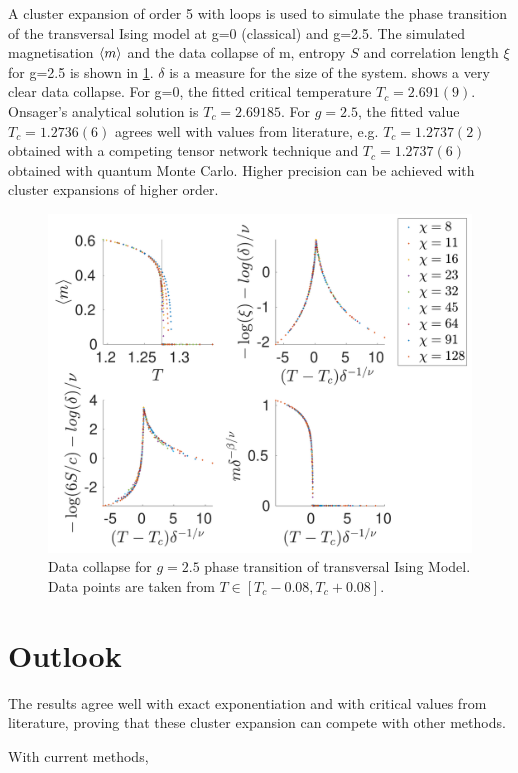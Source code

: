 \documentclass[twocolumn]{article}
\newcounter{a}
\newcounter{b}
\begin{document}
A cluster expansion of order 5 with loops is used to simulate the phase transition of the transversal Ising model at g=0 (classical) and g=2.5. The simulated magnetisation $ \braket{m}$ and the data collapse of m, entropy $S$ and correlation length $\xi$ for g=2.5 is shown in \cref{fig:phase:g25:zoomed}. $\delta$ is a measure for the size of the system.  shows a very clear data collapse. For g=0, the fitted critical temperature $T_c = 2.691(9)$. Onsager's analytical solution is $T_c = 2.69185$. For $g=2.5$, the fitted value $T_c=1.2736(6)$ agrees well with values from literature, e.g. $T_c=1.2737(2)$ obtained with a competing tensor network technique and $T_c=1.2737(6)$ obtained with quantum Monte Carlo. \cite{Czarnik2019} Higher precision can be achieved with cluster expansions of higher order.

\begin{figure}[h!]
    \center
    \includegraphics[width=\linewidth]{../Figuren/phasediag/g25/zoomed_small.pdf}
    \caption{ Data collapse for $g=2.5$ phase transition of transversal Ising Model. Data points are taken from $T \in \left[ T_c -0.08, T_c +0.08 \right]$. }
    \label{fig:phase:g25:zoomed}
\end{figure}

\section{Outlook}

The results agree well with exact exponentiation and with critical values from literature, proving that these cluster expansion can compete with other methods.  

With current methods,


\end{document}
